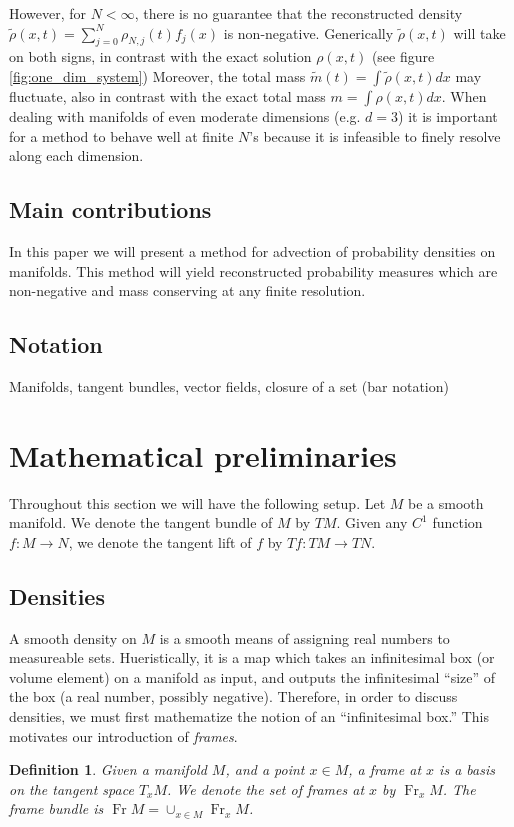 \documentclass[letterpaper, 10 pt, conference]{ieeeconf}
\newtheorem{defn}[thm]{Definition}
\DeclareMathOperator{\Fr}{Fr}
\begin{document}
  However, for $N < \infty$, there is no guarantee that the reconstructed
  density $\tilde{\rho}(x,t) = \sum_{j=0}^N \rho_{N,j}(t) f_j(x)$
  is non-negative.
  Generically $\tilde{\rho}(x,t)$ will take on both signs, in
  contrast with the exact solution $\rho(x,t)$ (see figure \ref{fig:one_dim_system})
  Moreover, the total mass $\tilde{m}(t) = \int \tilde{\rho}(x,t)dx$
  may fluctuate, also in contrast with the exact total mass
  $m = \int \rho(x,t) dx$.
  When dealing with manifolds of even moderate dimensions
  (e.g. $d=3$) it is important for a method to behave well at finite $N$'s
  because it is infeasible to finely resolve along each dimension.

\subsection{Main contributions}
  In this paper we will present a method for advection of
  probability densities on manifolds.
  This method will yield reconstructed probability measures
  which are non-negative and mass conserving at any finite resolution.

\subsection{Notation}
  Manifolds, tangent bundles, vector fields, closure of a set (bar notation)

\section{Mathematical preliminaries}
\label{sec:math}
  Throughout this section we will have the following
  setup.  Let $M$ be a smooth manifold.
  We denote the tangent bundle of $M$ by $TM$.
  Given any $C^1$ function $f:M \to N$,
  we denote the tangent lift of $f$ by $Tf:TM \to TN$.

\subsection{Densities}
  A smooth density on $M$ is a smooth means of
  assigning real numbers to measureable sets.
  Hueristically, it is a map which
  takes an infinitesimal box (or volume element)
  on a manifold as input, and outputs the infinitesimal ``size''
  of the box (a real number, possibly negative).
  Therefore, in order to discuss densities,
  we must first mathematize the notion of an ``infinitesimal box.''
  This motivates our introduction of \emph{frames}.
  \begin{defn}
  \label{eq:frame_bundle}
    Given a manifold $M$, and a point $x \in M$,
    a \emph{frame at $x$} is a basis on the tangent space $T_x M$.
    We denote the set of frames at $x$ by $\Fr_x M$.
    The frame bundle is $\Fr M = \cup_{x \in M} \Fr_x M$.
  \end{defn}
\end{document}
